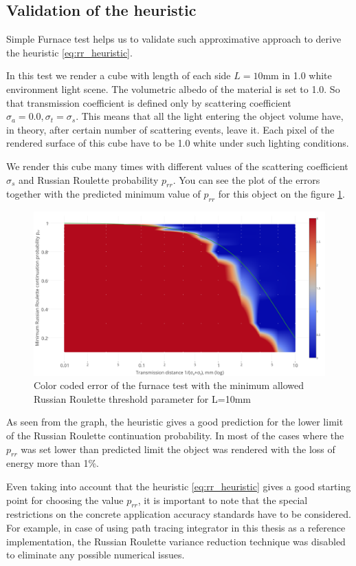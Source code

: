 \subsection{Validation of the heuristic}
Simple Furnace test helps us to validate such approximative approach to derive the heuristic
\ref{eq:rr_heuristic}.

In this test we render a cube with length of each side $L=10$mm in 1.0 white environment light scene.
The volumetric albedo of the material is set to 1.0. So that transmission coefficient is defined
only by scattering coefficient $\sigma_a=0.0, \sigma_t=\sigma_s$. This means that all the light
entering the object volume have, in theory, after certain number of scattering events, leave it.
Each pixel of the rendered surface of this cube have to be 1.0 white under such lighting conditions.

We render this cube many times with different values of the scattering coefficient $\sigma_s$ and
Russian Roulette probability $p_{rr}$. You can see the plot of the errors together with the
predicted minimum value of $p_{rr}$ for this object on the figure \ref{fig:rr_heuristic_heatmap}.
\begin{figure}[h]
    \centering
    \includegraphics[width=\textwidth]{imgs/plots/rr_heuristic_heatmap}
    \caption{Color coded error of the furnace test with the minimum allowed Russian Roulette
    threshold parameter for L=10mm}
    \label{fig:rr_heuristic_heatmap}
\end{figure}

As seen from the graph, the heuristic gives a good prediction for the lower limit of the  Russian
Roulette continuation probability. In most of the cases where the $p_{rr}$ was set lower than
predicted limit the object was rendered with the loss of energy more than 1\%.

Even taking into account that the heuristic \ref{eq:rr_heuristic} gives a good starting point for
choosing the value $p_{rr}$, it is important to note that the special restrictions on the concrete
application accuracy standards have to be considered. For example, in case of using path
tracing integrator in this thesis as a reference implementation, the Russian Roulette variance
reduction technique was disabled to eliminate any possible numerical issues.


